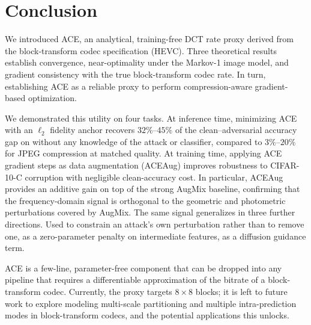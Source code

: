 \documentclass{article}
\theoremstyle{definition}
\begin{document}
\section{Conclusion}

We introduced ACE, an analytical, training-free DCT rate proxy derived from the block-transform codec specification (HEVC).
Three theoretical results establish convergence, near-optimality under the Markov-1 image model, and gradient consistency with the true block-transform codec rate.
In turn, establishing ACE as a reliable proxy to perform compression-aware gradient-based optimization.

We demonstrated this utility on four tasks.
At inference time, minimizing ACE with an $\ell_2$ fidelity anchor recovers $32\%$--$45\%$ of the clean--adversarial accuracy gap on without any knowledge of the attack or classifier, compared to $3\%$--$20\%$ for JPEG compression at matched quality.
At training time, applying ACE gradient steps as data augmentation (ACEAug) improves robustness to CIFAR-10-C corruption with negligible clean-accuracy cost.
In particular, ACEAug provides an additive gain on top of the strong AugMix baseline, confirming that the frequency-domain signal is orthogonal to the geometric and photometric perturbations covered by AugMix.
The same signal generalizes in three further directions.
Used to constrain an attack's own perturbation rather than to remove one, as a zero-parameter penalty on intermediate features, as a diffusion guidance term.

ACE is a few-line, parameter-free component that can be dropped into any pipeline that requires a differentiable approximation of the bitrate of a block-transform codec.
Currently, the proxy targets $8\times8$ blocks; it is left to future work to explore modeling multi-scale partitioning and multiple intra-prediction modes in block-transform codecs, and the potential applications this unlocks.



\end{document}
